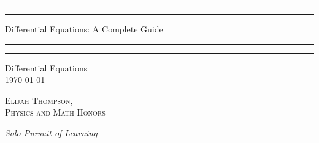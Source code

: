 \documentclass[12pt, a4paper, oneside, openright, titlepage]{book}
\begin{document}

\begin{titlepage}
    \centering
    \scshape
    \vspace*{\baselineskip}
    \rule{\textwidth}{1.6pt}\vspace*{-\baselineskip}\vspace*{2pt}
    \rule{\textwidth}{0.4pt}
    
    \vspace{0.75\baselineskip}
    
    {\LARGE Differential Equations: A Complete Guide}
    
    \vspace{0.75\baselineskip}
    
    \rule{\textwidth}{0.4pt}\vspace*{-\baselineskip}\vspace{3.2pt}
    \rule{\textwidth}{1.6pt}
    
    \vspace{2\baselineskip}
    Differential Equations \\
    \vspace*{3\baselineskip}
    \monthdayyeardate\today \\
    \vspace*{5.0\baselineskip}
    
    {\scshape\Large Elijah Thompson, \\ Physics and Math Honors\\}
    
    \vspace{1.0\baselineskip}
    \textit{Solo Pursuit of Learning}
    \vfill
    \enlargethispage{1in}
    \begin{figure}[b!]
    \end{figure}
\end{titlepage}

\tableofcontents






\begin{appendices}


\end{appendices}
\end{document}
